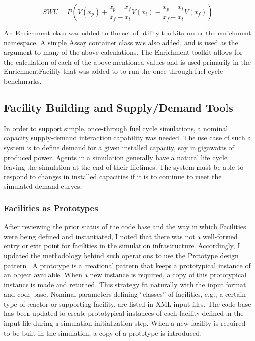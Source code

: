 \begin{equation}\label{eqs:enr-swu-p}
  SWU = P \left( V(x_{p}) + \frac{x_{p} - x_{f}}{x_{f} - x_{t}} V(x_{t}) 
        - \frac{x_{p} - x_{t}}{x_{f} - x_{t}} V(x_{f}) \right)
\end{equation}

An Enrichment class was added to the \Cyclus set of utility toolkits under the
enrichment namespace. A simple Assay container class was also added, and is used
as the argument to many of the above calculations. The Enrichment toolkit allows
for the calculation of each of the above-mentioned values and is used primarily
in the EnrichmentFacility that was added to \Cycamore to run the once-through
fuel cycle benchmarks.

\subsection{Facility Building and Supply/Demand Tools}

In order to support simple, once-through fuel cycle simulations, a nominal
capacity supply-demand interaction capability was needed. The use case of such a
system is to define demand for a given installed capacity, say in gigawatts of
produced power. Agents in a \Cyclus simulation generally have a natural
life cycle, leaving the simulation at the end of their lifetimes. The system must
be able to respond to changes in installed capacities if it is to continue to
meet the simulated demand curves.

\subsubsection{Facilities as Prototypes}
After reviewing the prior status of the code base and the way in which
Facilities were being defined and instantiated, I noted that there was not a
well-formed entry or exit point for facilities in the simulation
infrastructure. Accordingly, I updated the methodology behind such operations to
use the Prototype design pattern \cite{vlissides_design_1995}. A prototype is a
creational pattern that keeps a prototypical instance of an object
available. When a new instance is required, a copy of this prototypical instance
is made and returned. This strategy fit naturally with the \Cyclus input format
and code base. Nominal parameters defining ``classes'' of facilities, e.g., a
certain type of reactor or supporting facility, are listed in XML input
files. The code base has been updated to create prototypical instances of each
facility defined in the input file during a simulation initialization step. When
a new facility is required to be built in the simulation, a copy of a prototype
is introduced.

